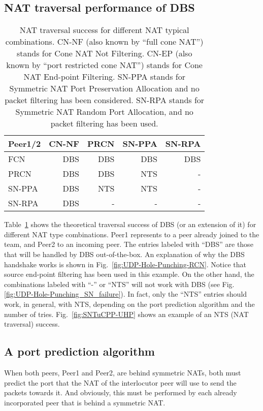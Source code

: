 \subsection{NAT traversal performance of DBS}

\begin{table}
  \centering
  \begin{tabular}{l|r|r|r|r}
    Peer1/2 & CN-NF & PRCN  & SN-PPA & SN-RPA \\
    \hline
    FCN     & DBS   & DBS   & DBS    & DBS    \\
    PRCN    & DBS   & DBS   & NTS    & -      \\
    SN-PPA  & DBS   & NTS   & NTS    & -      \\
    SN-RPA  & DBS   & -     & -      & -
  \end{tabular}
  \caption{NAT traversal success for different NAT typical
    combinations.  CN-NF (also known by ``full cone NAT'') stands for
    Cone NAT Not Filtering. CN-EP (also known by ``port restricted
    cone NAT'') stands for Cone NAT End-point Filtering. SN-PPA stands
    for Symmetric NAT Port Preservation Allocation and no packet
    filtering has been considered. SN-RPA stands for Symmetric NAT
    Random Port Allocation, and no packet filtering has been used.
    \label{tab:theoretical}}
\end{table}

Table~\ref{tab:theoretical} shows the theoretical traversal success of
DBS (or an extension of it) for different NAT type combinations. Peer1
represents to a peer already joined to the team, and Peer2 to an
incoming peer. The entries labeled with ``DBS'' are those that will be
handled by DBS out-of-the-box. An explanation of why the DBS handshake
works is shown in Fig.~\ref{fig:UDP-Hole-Punching-RCN}.  Notice that
source end-point filtering has been used in this example. On the other
hand, the combinations labeled with ``-'' or ``NTS'' will not work
with DBS (see Fig.\ref{fig:UDP-Hole-Punching_SN_failure}). In fact,
only the ``NTS'' entries should work, in general, with NTS, depending
on the port prediction algorithm and the number of
tries. Fig.~\ref{fig:SNTuCPP-UHP} shows an example of an NTS (NAT
traversal) success.

\subsection{A port prediction algorithm}
When both peers, Peer1 and Peer2, are behind symmetric NATs, both must
predict the port that the NAT of the interlocutor peer will use to
send the packets towards it. And obviously, this must be performed by
each already incorporated peer that is behind a symmetric NAT.

